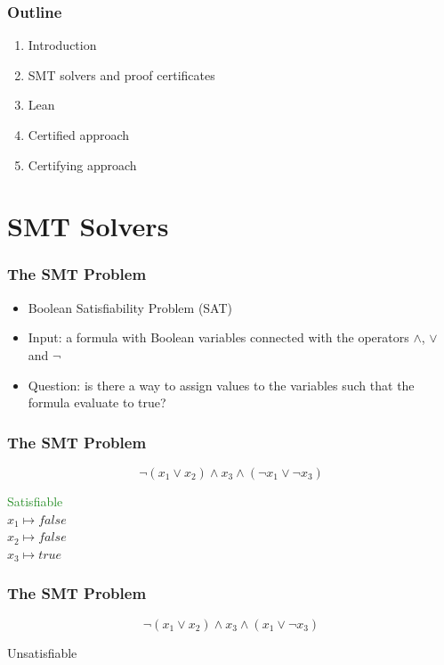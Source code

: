 \documentclass[usepdftitle=false,aspectratio=169,usenames,dvipsnames]{beamer}
\newcommand{\bluecheck}{{\color{blue}\checkmark}}
\newcommand\vitem{\vfill\item}
\begin{document}
\begin{frame}
  \frametitle{Outline}
  \begin{enumerate}
    \item Introduction \bluecheck
    \vitem SMT solvers and proof certificates
    \vitem Lean
    \vitem Certified approach
    \vitem Certifying approach
  \end{enumerate}
\end{frame}

\section{SMT Solvers}

\begin{frame}
  \frametitle{The SMT Problem}
  \begin{itemize}
    \item Boolean Satisfiability Problem (SAT)
    \vitem Input: a formula with Boolean variables connected with the operators $\wedge$, $\vee$ and $\neg$
    \vitem Question: is there a way to assign values to the variables such that the formula evaluate to true?
  \end{itemize}
\end{frame}


\begin{frame}
  \frametitle{The SMT Problem}
  \begin{overprint}
    \medskip
    $$\neg (x_{1} \vee x_{2}) \wedge x_{3} \wedge (\neg x_{1} \vee \neg x_{3})$$
  \end{overprint}
  \vfill
  \begin{overprint}
    \begin{center}
      \textcolor{ForestGreen}{Satisfiable}\\
    $x_{1} \mapsto false$ \\
    $x_{2} \mapsto false$ \\
    $x_{3} \mapsto true$
    \end{center}
  \end{overprint}
\end{frame}

\begin{frame}
  \frametitle{The SMT Problem}
  \begin{overprint}
    \medskip
    $$\neg (x_{1} \vee x_{2}) \wedge x_{3} \wedge (x_{1} \vee \neg x_{3})$$
  \end{overprint}
  \vfill
  \begin{overprint}
    \begin{center}
      \color{red}Unsatisfiable
    \end{center}
  \end{overprint}
\end{frame}
\end{document}
